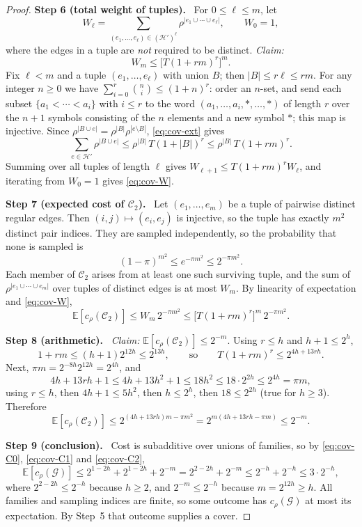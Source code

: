 \documentclass[11pt,letterpaper]{article}
\theoremstyle{definition}
\theoremstyle{remark}
\numberwithin{equation}{section}
\newcommand{\step}[1]{\medskip\noindent\textbf{#1.}\ }
\begin{document}
\begin{proof}
\step{Step 6 (total weight of tuples)}
For \(0\le \ell\le m\), let
\[
W_\ell=
\sum_{(e_1,\ldots,e_\ell)\in(\mathcal H')^\ell}
  \rho^{|e_1\cup\cdots\cup e_\ell|},
\qquad W_0=1,
\]
where the edges in a tuple are \emph{not} required to be distinct.
\emph{Claim:}
\begin{equation}\label{eq:cov-W}
W_m\le\bigl[T(1+rm)^r\bigr]^m.
\end{equation}
Fix $\ell<m$ and a tuple $(e_1,\ldots,e_\ell)$ with union $B$; then
$|B|\le r\ell\le rm$. For any integer $n\ge0$ we have
$\sum_{i=0}^r\binom ni\le(1+n)^r$: order an $n$-set, and send each subset
$\{a_1<\cdots<a_i\}$ with $i\le r$ to the word
$(a_1,\ldots,a_i,\ast,\ldots,\ast)$ of length $r$ over the $n+1$ symbols
consisting of the $n$ elements and a new symbol $\ast$; this map is injective.
Since $\rho^{|B\cup e|}=\rho^{|B|}\rho^{|e\setminus B|}$,
\eqref{eq:cov-ext} gives
\[
\sum_{e\in\mathcal H'}\rho^{|B\cup e|}
\le\rho^{|B|}\,T(1+|B|)^r
\le\rho^{|B|}\,T(1+rm)^r.
\]
Summing over all tuples of length $\ell$ gives
$W_{\ell+1}\le T(1+rm)^rW_\ell$, and iterating from $W_0=1$ gives
\eqref{eq:cov-W}.

\step{Step 7 (expected cost of $\mathcal C_2$)}
Let $(e_1,\ldots,e_m)$ be a tuple of pairwise distinct regular edges. Then
$(i,j)\mapsto(e_i,e_j)$ is injective, so the tuple has exactly $m^2$ distinct
pair indices. They are sampled independently, so the probability that none is
sampled is
\[
(1-\pi)^{m^2}\le e^{-\pi m^2}\le2^{-\pi m^2}.
\]
Each member of $\mathcal C_2$ arises from at least one such surviving tuple,
and the sum of $\rho^{|e_1\cup\cdots\cup e_m|}$ over tuples of distinct edges
is at most $W_m$. By linearity of expectation and \eqref{eq:cov-W},
\[
\mathbb E[c_\rho(\mathcal C_2)]
\le W_m\,2^{-\pi m^2}
\le\bigl[T(1+rm)^r\bigr]^m\,2^{-\pi m^2}.
\]

\step{Step 8 (arithmetic)}
\emph{Claim:} $\mathbb E[c_\rho(\mathcal C_2)]\le2^{-m}$.
Using $r\le h$ and $h+1\le2^h$,
\[
1+rm\le(h+1)2^{12h}\le2^{13h},
\qquad\text{so}\qquad
T(1+rm)^r\le2^{4h+13rh}.
\]
Next, $\pi m=2^{-8h}2^{12h}=2^{4h}$, and
\begin{equation}\label{eq:cov-arith}
4h+13rh+1\le4h+13h^2+1\le18h^2
\le18\cdot2^{2h}\le2^{4h}=\pi m,
\end{equation}
using $r\le h$, then $4h+1\le5h^2$, then $h\le2^h$, then $18\le2^{2h}$ (true
for $h\ge3$). Therefore
\begin{equation}\label{eq:cov-C2}
\mathbb E[c_\rho(\mathcal C_2)]
\le2^{(4h+13rh)m-\pi m^2}
=2^{m(4h+13rh-\pi m)}\le2^{-m}.
\end{equation}

\step{Step 9 (conclusion)}
Cost is subadditive over unions of families, so by \eqref{eq:cov-C0},
\eqref{eq:cov-C1} and \eqref{eq:cov-C2},
\[
\mathbb E[c_\rho(\mathcal G)]
\le2^{1-2h}+2^{1-2h}+2^{-m}
=2^{2-2h}+2^{-m}\le2^{-h}+2^{-h}\le3\cdot2^{-h},
\]
where $2^{2-2h}\le2^{-h}$ because $h\ge2$, and $2^{-m}\le2^{-h}$ because
$m=2^{12h}\ge h$. All families and sampling indices are finite, so some
outcome has $c_\rho(\mathcal G)$ at most its expectation. By Step~5 that
outcome supplies a cover.
\end{proof}
\end{document}

